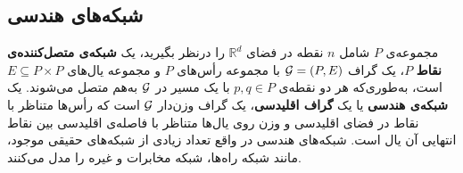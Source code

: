 \subsection{شبکه‌های هندسی}
مجموعه‌ی $P$ شامل $n$ نقطه در فضای $\mathbb{R}^d$ را درنظر بگیرید، یک \textbf{شبکه‌ی متصل‌کننده‌ی نقاط} $P$، یک گراف ${\cal G} = (P, E)$ با مجموعه رأس‌های $P$ و مجموعه یال‌های $E \subseteq P\times P$  است، به‌طوری‌که هر دو نقطه‌ی $p, q \in P$ با یک مسیر در $\cal G$ به‌هم متصل می‌شوند. یک \textbf{شبکه‌ی هندسی} یا یک \textbf{گراف اقلیدسی}، یک گراف وزن‌دار ${\cal G}$ است که رأس‌ها متناظر با نقاط در فضای اقلیدسی و وزن روی یال‌ها متناظر با فاصله‌‌ی اقلیدسی بین نقاط انتهایی آن یال است. شبکه‌های هندسی در واقع تعداد زیادی از شبکه‌های حقیقی موجود، مانند شبکه راه‌ها، شبکه مخابرات و غیره را مدل می‌کنند.

